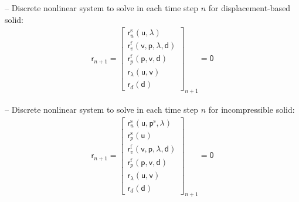 \documentclass[a4paper,12pt]{report}
\newcommand{\bs}[1]{\boldsymbol{#1}}
\newcommand{\ROP}{\bs{\mathsf{r}}}
\newcommand{\LM}{\bs{\mathsf{\lambda}}}
\begin{document}
-- Discrete nonlinear system to solve in each time step $n$ for displacement-based solid:
\begin{equation}
\label{equation-nonlin-sys-fsi}
\begin{aligned}
\ROP_{n+1} = \begin{bmatrix} \ROP_{u}^{\mathrm{s}}(\boldsymbol{\mathsf{u}},\LM) \\ \ROP_{v}^{\mathrm{f}}(\boldsymbol{\mathsf{v}},\boldsymbol{\mathsf{p}},\LM,\boldsymbol{\mathsf{d}}) \\ \ROP_{p}^{\mathrm{f}}(\boldsymbol{\mathsf{p}},\boldsymbol{\mathsf{v}},\boldsymbol{\mathsf{d}}) \\ \ROP_{\lambda}(\boldsymbol{\mathsf{u}},\boldsymbol{\mathsf{v}}) \\ \ROP_{d}(\boldsymbol{\mathsf{d}}) \end{bmatrix}_{n+1} = \boldsymbol{\mathsf{0}}
\end{aligned}
\end{equation}

-- Discrete nonlinear system to solve in each time step $n$ for incompressible solid:
\begin{equation}
\label{equation-nonlin-sys-fsi-inc}
\begin{aligned}
\ROP_{n+1} = \begin{bmatrix} \ROP_{u}^{\mathrm{s}}(\boldsymbol{\mathsf{u}},\boldsymbol{\mathsf{p}}^{\mathrm{s}},\LM) \\ \ROP_{p}^{\mathrm{s}}(\boldsymbol{\mathsf{u}}) \\ \ROP_{v}^{\mathrm{f}}(\boldsymbol{\mathsf{v}},\boldsymbol{\mathsf{p}},\LM,\boldsymbol{\mathsf{d}}) \\ \ROP_{p}^{\mathrm{f}}(\boldsymbol{\mathsf{p}},\boldsymbol{\mathsf{v}},\boldsymbol{\mathsf{d}}) \\ \ROP_{\lambda}(\boldsymbol{\mathsf{u}},\boldsymbol{\mathsf{v}}) \\ \ROP_{d}(\boldsymbol{\mathsf{d}}) \end{bmatrix}_{n+1} = \boldsymbol{\mathsf{0}}
\end{aligned}
\end{equation}
\end{document}
